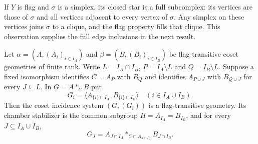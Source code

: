 If $Y$ is flag and $\sigma$ is a simplex, its closed star is a full
subcomplex: its vertices are those of $\sigma$ and all vertices adjacent
to every vertex of $\sigma$. Any simplex on these vertices joins
$\sigma$ to a clique, and the flag property fills that clique.
This observation supplies the full edge inclusions in the next result.

\begin{theorem}\label{T-thm:amalgam}
Let $\alpha=(A,(A_i)_{i\in I_A})$ and
$\beta=(B,(B_i)_{i\in I_B})$ be flag-transitive coset geometries
of finite rank. Write $L=I_A\cap I_B$, $P=I_A\setminus L$ and
$Q=I_B\setminus L$. Suppose a fixed isomorphism identifies
$C=A_P$ with $B_Q$ and identifies $A_{P\cup J}$ with $B_{Q\cup J}$
for every $J\subseteq L$.
In $G=A*_C B$ put
\[
 G_i=\langle A_{\{i\}\cap I_A},B_{\{i\}\cap I_B}\rangle
 \quad(i\in I_A\cup I_B).
\]
Then the coset incidence system $(G,(G_i))$ is a flag-transitive
geometry. Its chamber stabilizer is the common subgroup
$H=A_{I_A}=B_{I_B}$, and for every $J\subseteq I_A\cup I_B$,
\[
 G_J=A_{J\cap I_A}*_{C\cap A_{J\cap I_A}}B_{J\cap I_B}.
\]
\end{theorem}
